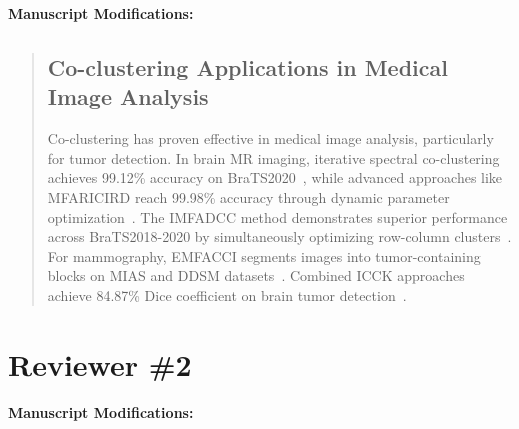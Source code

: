 \documentclass{ar2rc}
\renewcommand{\cite}[1]{~\autocite{#1}}
\begin{document}
\textbf{Manuscript Modifications:}

\begin{quote}
  \subsection*{ Co-clustering Applications in Medical Image Analysis}
  Co-clustering has proven effective in medical image analysis, particularly for tumor detection. In brain MR imaging, iterative spectral co-clustering achieves 99.12\% accuracy on BraTS2020\cite{farnoosh2024DevelopmentUnsupervisedPseudodeep}, while advanced approaches like MFARICIRD reach 99.98\% accuracy through dynamic parameter optimization\cite{farnoosh2025PseudodeepUnsupervisedModelbased}. The IMFADCC method demonstrates superior performance across BraTS2018-2020 by simultaneously optimizing row-column clusters\cite{farnoosh2024BrainMagneticResonance}. For mammography, EMFACCI segments images into tumor-containing blocks on MIAS and DDSM datasets\cite{farnoosh2024NovelApproachAutomatic}. Combined ICCK approaches achieve 84.87\% Dice coefficient on brain tumor detection\cite{farnoosh2022ApplicationModifiedCombinational}.
\end{quote}


\section{Reviewer \#2}



\textbf{Manuscript Modifications:}
\end{document}
